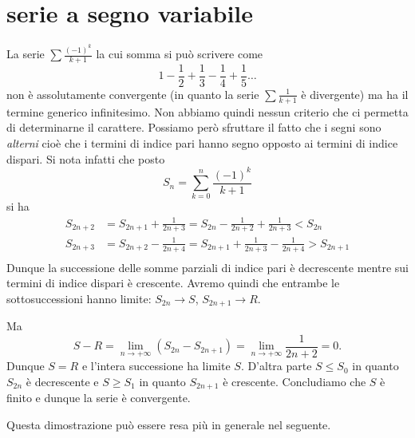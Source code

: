 \section{serie a segno variabile}

La serie $\sum \frac{(-1)^k}{k+1}$ la cui somma si può scrivere come
%
\[
1 - \frac{1}{2} + \frac{1}{3} - \frac{1}{4} +  \frac{1}{5} \dots
\]
non è assolutamente convergente
(in quanto la serie $\sum \frac 1 {k+1}$ è divergente) ma ha il termine generico
infinitesimo. Non abbiamo quindi nessun criterio che ci permetta di
determinarne il carattere.
Possiamo però sfruttare il fatto che i segni sono \emph{alterni} cioè
che i termini di indice pari hanno segno opposto ai termini di indice dispari. Si nota infatti che posto
\[
  S_n = \sum_{k=0}^n \frac{(-1)^k}{k+1}
\]
si ha
\begin{align*}
S_{2n+2}
  &= S_{2n+1} + \frac{1}{2n+3}
  = S_{2n} - \frac{1}{2n+2} + \frac{1}{2n+3}
  < S_{2n}\\
S_{2n+3}
  &= S_{2n+2} - \frac{1}{2n+4}
  = S_{2n+1} + \frac{1}{2n+3} - \frac{1}{2n+4}
  > S_{2n+1} \\
\end{align*}
Dunque la successione delle somme parziali di indice pari è decrescente mentre
sui termini di indice dispari è crescente. Avremo quindi che entrambe
le sottosuccessioni hanno limite: $S_{2n} \to S$, $S_{2n+1} \to R$.

Ma
\[
  S - R = \lim_{n\to +\infty} (S_{2n} - S_{2n+1}) = \lim_{n\to+\infty}\frac{1}{2n+2} = 0.
\]
Dunque $S=R$ e l'intera successione ha limite $S$. 
D'altra parte $S \le S_0$ in quanto $S_{2n}$ è decrescente e $S\ge S_1$ in quanto $S_{2n+1}$ è crescente. 
Concludiamo che $S$ è finito e dunque la serie è convergente.%

Questa dimostrazione può essere resa più in generale nel seguente.

